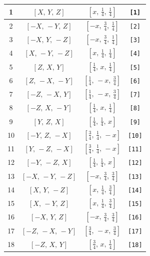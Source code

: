 \documentclass[fleqn,8pt]{jsarticle}
\begin{document}
\begin{longtable}{cccc}
1 & $\left[ X,\, Y,\, Z \right]$ & $\left[ x,\, \frac{1}{4},\, \frac{1}{4} \right]$ & {\tt [1]} \\ \hline
2 & $\left[ - X,\, - Y,\, Z \right]$ & $\left[ - x,\, \frac{3}{4},\, \frac{1}{4} \right]$ & {\tt [2]} \\ \hline
3 & $\left[ - X,\, Y,\, - Z \right]$ & $\left[ - x,\, \frac{3}{4},\, \frac{1}{4} \right]$ & {\tt [3]} \\ \hline
4 & $\left[ X,\, - Y,\, - Z \right]$ & $\left[ x,\, \frac{1}{4},\, \frac{1}{4} \right]$ & {\tt [4]} \\ \hline
5 & $\left[ Z,\, X,\, Y \right]$ & $\left[ \frac{1}{4},\, x,\, \frac{1}{4} \right]$ & {\tt [5]} \\ \hline
6 & $\left[ Z,\, - X,\, - Y \right]$ & $\left[ \frac{1}{4},\, - x,\, \frac{3}{4} \right]$ & {\tt [6]} \\ \hline
7 & $\left[ - Z,\, - X,\, Y \right]$ & $\left[ \frac{1}{4},\, - x,\, \frac{3}{4} \right]$ & {\tt [7]} \\ \hline
8 & $\left[ - Z,\, X,\, - Y \right]$ & $\left[ \frac{1}{4},\, x,\, \frac{1}{4} \right]$ & {\tt [8]} \\ \hline
9 & $\left[ Y,\, Z,\, X \right]$ & $\left[ \frac{1}{4},\, \frac{1}{4},\, x \right]$ & {\tt [9]} \\ \hline
10 & $\left[ - Y,\, Z,\, - X \right]$ & $\left[ \frac{3}{4},\, \frac{1}{4},\, - x \right]$ & {\tt [10]} \\ \hline
11 & $\left[ Y,\, - Z,\, - X \right]$ & $\left[ \frac{3}{4},\, \frac{1}{4},\, - x \right]$ & {\tt [11]} \\ \hline
12 & $\left[ - Y,\, - Z,\, X \right]$ & $\left[ \frac{1}{4},\, \frac{1}{4},\, x \right]$ & {\tt [12]} \\ \hline
13 & $\left[ - X,\, - Y,\, - Z \right]$ & $\left[ - x,\, \frac{3}{4},\, \frac{3}{4} \right]$ & {\tt [13]} \\ \hline
14 & $\left[ X,\, Y,\, - Z \right]$ & $\left[ x,\, \frac{1}{4},\, \frac{3}{4} \right]$ & {\tt [14]} \\ \hline
15 & $\left[ X,\, - Y,\, Z \right]$ & $\left[ x,\, \frac{1}{4},\, \frac{3}{4} \right]$ & {\tt [15]} \\ \hline
16 & $\left[ - X,\, Y,\, Z \right]$ & $\left[ - x,\, \frac{3}{4},\, \frac{3}{4} \right]$ & {\tt [16]} \\ \hline
17 & $\left[ - Z,\, - X,\, - Y \right]$ & $\left[ \frac{3}{4},\, - x,\, \frac{3}{4} \right]$ & {\tt [17]} \\ \hline
18 & $\left[ - Z,\, X,\, Y \right]$ & $\left[ \frac{3}{4},\, x,\, \frac{1}{4} \right]$ & {\tt [18]} \\ \hline

\end{longtable}
\end{document}
